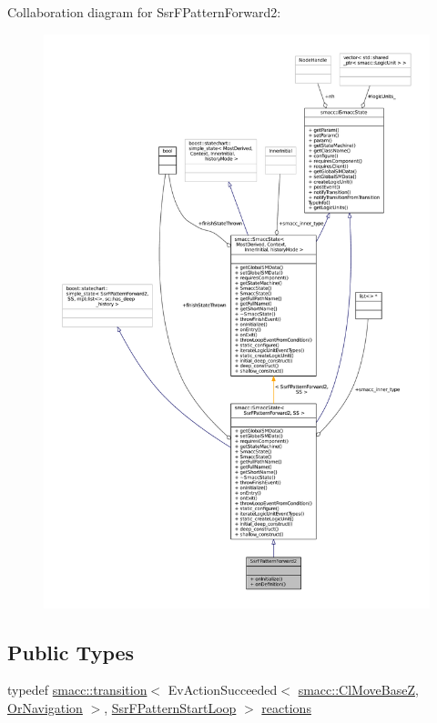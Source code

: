 Collaboration diagram for Ssr\+F\+Pattern\+Forward2\+:
\nopagebreak
\begin{figure}[H]
\begin{center}
\leavevmode
\includegraphics[width=350pt]{structSsrFPatternForward2__coll__graph}
\end{center}
\end{figure}
\subsection*{Public Types}
\begin{DoxyCompactItemize}
\item 
typedef \hyperlink{classsmacc_1_1transition}{smacc\+::transition}$<$ Ev\+Action\+Succeeded$<$ \hyperlink{classsmacc_1_1ClMoveBaseZ}{smacc\+::\+Cl\+Move\+BaseZ}, \hyperlink{classOrNavigation}{Or\+Navigation} $>$, \hyperlink{structSsrFPatternStartLoop}{Ssr\+F\+Pattern\+Start\+Loop} $>$ \hyperlink{structSsrFPatternForward2_adc3056f3a7551d387d3c1b8dae279e3b}{reactions}
\end{DoxyCompactItemize}
